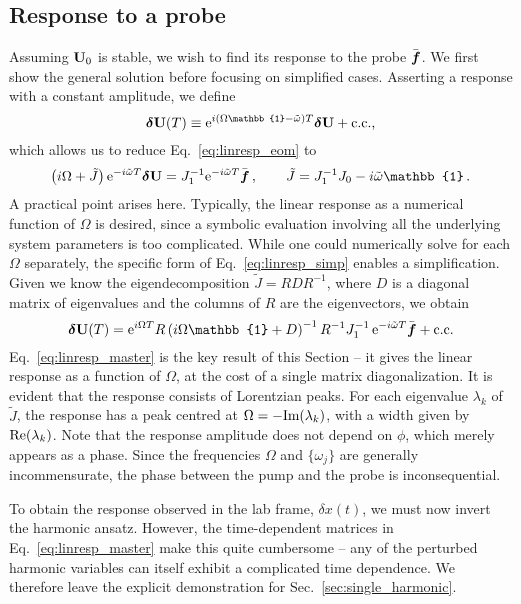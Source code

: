 \subsection{Response to a probe} \label{sec:linresp_response1}
Assuming $\vb{U}_0$ is stable, we wish to find its response to the probe $\bar{\boldsymbol{f}}$. We first show the general solution before focusing on simplified cases. Asserting a response with a constant amplitude, we define
\begin{equation} \label{eq:linresp_steady_resp}
\bdel{U}(T) \equiv  \e^{i(\Omega \mathbb{1}- \tilde{\omega}) T} \bdel{U} + \text{c.c.,} 
\end{equation}
which allows us to reduce Eq.~\eqref{eq:linresp_eom} to
\begin{equation} \label{eq:linresp_simp}
\left( i \Omega + \tilde{J}\right) \e^{-i \tilde{\omega}T} \bdel{U} = J_1^{-1} \e^{-i \tilde{\omega} T} \bbar{f} \,, \qquad \tilde{J} = J_1^{-1} J_0 - i \tilde{\omega} \mathbb{1}\,.
\end{equation}
A practical point arises here. Typically, the linear response as a numerical function of $\Omega$ is desired, since a symbolic evaluation involving all the underlying system parameters is too complicated. While one could numerically solve for each $\Omega$ separately, the specific form of Eq.~\eqref{eq:linresp_simp} enables a simplification. Given we know the eigendecomposition $\tilde{J} = R D R^{-1}$, where $D$ is a diagonal matrix of eigenvalues and the columns of $R$ are the eigenvectors, we obtain 
\begin{equation} \label{eq:linresp_master}
\bdel{U}(T) = \e^{i \Omega T} R \left( i \Omega \mathbb{1} + D \right)^{-1} R^{-1} J_1^{-1} \,\e^{-i \tilde{\omega} T} \bbar{f} + \text{c.c.}
\end{equation}
Eq.~\eqref{eq:linresp_master} is the key result of this Section -- it gives the linear response as a function of $\Omega$, at the cost of a single matrix diagonalization. It is evident that the response consists of Lorentzian peaks. For each eigenvalue $\lambda_k$ of $\tilde{J}$, the response has a peak centred at $\Omega = -\text{Im} (\lambda_k)$, with a width given by $\text{Re} (\lambda_k)$. Note that the response amplitude does not depend on $\phi$, which merely appears as a phase. Since the frequencies $\Omega$ and $\{\omega_j\}$ are generally incommensurate, the phase between the pump and the probe is inconsequential.

To obtain the response observed in the lab frame, $\delta x(t)$, we must now invert the harmonic ansatz. However, the time-dependent matrices in Eq.~\eqref{eq:linresp_master} make this quite cumbersome -- any of the perturbed harmonic variables can itself exhibit a complicated time dependence. We therefore leave the explicit demonstration for Sec.~\ref{sec:single_harmonic}.

